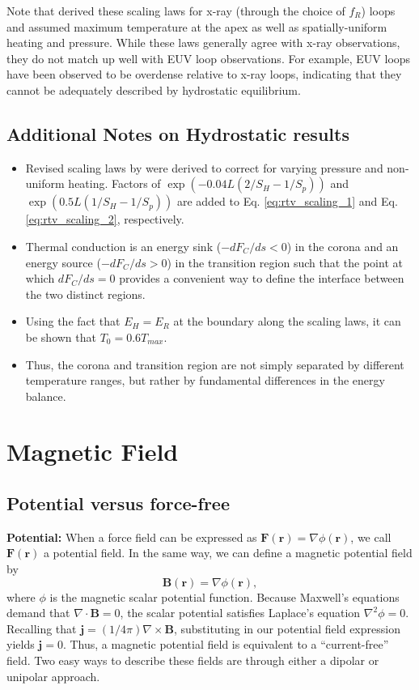 	Note that \citet{rosner_dynamics_1978} derived these scaling laws for x-ray (through the choice of $f_R$) loops and assumed maximum temperature at the apex as well as spatially-uniform heating and pressure. While these laws generally agree with x-ray observations, they do not match up well with EUV loop observations. For example, EUV loops have been observed to be overdense relative to x-ray loops, indicating that they cannot be adequately described by hydrostatic equilibrium.  

	\subsection{Additional Notes on Hydrostatic results}
	\begin{itemize}
		\item Revised scaling laws by \citet{serio_closed_1981} were derived to correct for varying pressure and non-uniform heating. Factors of $\exp{(-0.04L(2/S_H-1/S_p))}$ and $\exp{(0.5L(1/S_H-1/S_p))}$ are added to Eq. \ref{eq:rtv_scaling_1} and Eq. \ref{eq:rtv_scaling_2}, respectively. 
		\item Thermal conduction is an energy sink ($-dF_C/ds<0$) in the corona and an energy source ($-dF_C/ds>0$) in the transition region such that the point at which $dF_C/ds=0$ provides a convenient way to define the interface between the two distinct regions.
		\item Using the fact that $E_H=E_R$ at the boundary along the scaling laws, it can be shown that $T_0=0.6T_{max}.$
		\item Thus, the corona and transition region are not simply separated by different temperature ranges, but rather by fundamental differences in the energy balance.
	\end{itemize}

\section{Magnetic Field}
	
	\subsection{Potential versus force-free}
	\citep[see][]{aschwanden_physics_2006}

	\textbf{Potential:} When a force field can be expressed as $\mathbf{F}(\mathbf{r})=\nabla\phi(\mathbf{r})$, we call $\mathbf{F}(\mathbf{r})$ a potential field. In the same way, we can define a magnetic potential field by
	\begin{equation}
		\label{eq:potential field}
		\mathbf{B}(\mathbf{r}) = \nabla\phi(\mathbf{r}),
	\end{equation}
	where $\phi$ is the magnetic scalar potential function. Because Maxwell's equations demand that $\nabla\cdot\mathbf{B}=0$, the scalar potential satisfies Laplace's equation $\nabla^2\phi=0$. Recalling that $\mathbf{j}=(1/4\pi)\nabla\times\mathbf{B}$, substituting in our potential field expression yields $\mathbf{j}=0$. Thus, a magnetic potential field is equivalent to a ``current-free'' field. Two easy ways to describe these fields are through either a dipolar or unipolar approach. 
	
